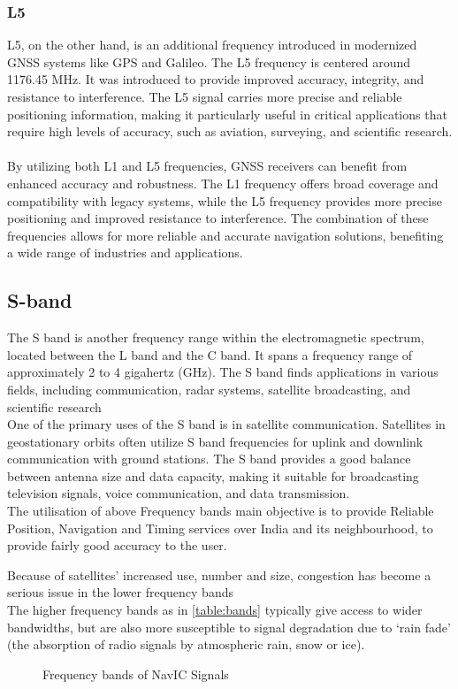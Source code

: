 \subsubsection{L5}
L5, on the other hand, is an additional frequency introduced in modernized GNSS systems like GPS and Galileo. The L5 frequency is centered around 1176.45 MHz. It was introduced to provide improved accuracy, integrity, and resistance to interference. The L5 signal carries more precise and reliable positioning information, making it particularly useful in critical applications that require high levels of accuracy, such as aviation, surveying, and scientific research.
\\
\\
By utilizing both L1 and L5 frequencies, GNSS receivers can benefit from enhanced accuracy and robustness. The L1 frequency offers broad coverage and compatibility with legacy systems, while the L5 frequency provides more precise positioning and improved resistance to interference. The combination of these frequencies allows for more reliable and accurate navigation solutions, benefiting a wide range of industries and applications.
\subsection{S-band} 
The S band is another frequency range within the electromagnetic spectrum, located between the L band and the C band. It spans a frequency range of approximately 2 to 4 gigahertz (GHz). The S band finds applications in various fields, including communication, radar systems, satellite broadcasting, and scientific research
\\
One of the primary uses of the S band is in satellite communication. Satellites in geostationary orbits often utilize S band frequencies for uplink and downlink communication with ground stations. The S band provides a good balance between antenna size and data capacity, making it suitable for broadcasting television signals, voice communication, and data transmission.
\\	
The utilisation of above Frequency bands main objective is to provide Reliable Position, Navigation and Timing services over India and its neighbourhood, to provide fairly good accuracy to the user. 

Because of satellites’ increased use, number and size, congestion has become a serious issue in the lower frequency bands
\\
The higher frequency bands as in \ref{table:bands} typically give access to wider bandwidths, but are also more susceptible to signal degradation due to ‘rain fade’ (the absorption of radio signals by atmospheric rain, snow or ice).
	\begin{figure}[!ht]
	\centering
	
	\caption{Frequency bands of NavIC Signals}
	\label{figure:bandsfig}
	\end{figure}


